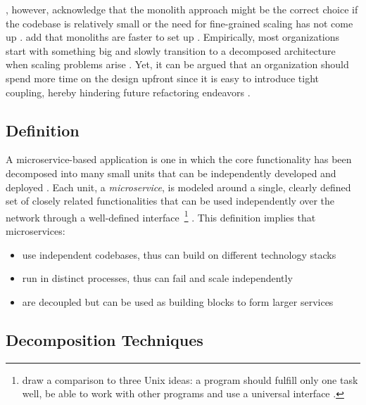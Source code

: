 \citeauthor{kalske2017challenges}, however, acknowledge that the monolith approach might be the correct choice if the codebase is relatively small or the need for fine-grained scaling has not come up \cite[pp.~34,~36]{kalske2017challenges}. \citeauthor{villamizar2015evaluating} add that monoliths are faster to set up \cite[p.~589]{villamizar2015evaluating}. Empirically, most organizations start with something big and slowly transition to a decomposed architecture when scaling problems arise \cite[p.~113]{thones2015microservices} \cite[p.~590]{villamizar2015evaluating}. Yet, it can be argued that an organization should spend more time on the design upfront since it is easy to introduce tight coupling, hereby hindering future refactoring endeavors \cite[p.~34]{kalske2017challenges}.


\subsection{Definition}
\label{sec:microservice-definition}

A microservice-based application is one in which the core functionality has been decomposed into many small units that can be independently developed and deployed \cite[p.~43]{khan2017key} \cite[p.~970]{vayghan2018deploying}. Each unit, a \textit{microservice}, is modeled around a single, clearly defined set of closely related functionalities that can be used independently over the network through a well-defined interface~\footnote{\citeauthor{cerny2018contextual} draw a comparison to three Unix ideas: a program should fulfill only one task well, be able to work with other programs and use a universal interface \cite[p.~31]{cerny2018contextual}.} \cite[p.~56]{taibi2018definition} \cite[p.~176]{vayghan2019microservice} \cite[p.~30]{cerny2018contextual}. This definition implies that microservices:

\begin{itemize}
  \item use independent codebases, thus can build on different technology stacks
  \item run in distinct processes, thus can fail and scale independently
  \item are decoupled but can be used as building blocks to form larger services
\end{itemize}


\subsection{Decomposition Techniques}
\label{sec:microservice-decomposition}

